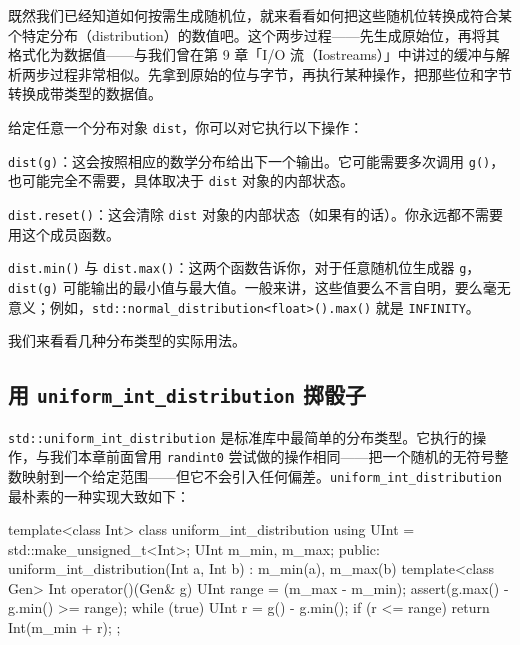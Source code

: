 既然我们已经知道如何按需生成随机位，就来看看如何把这些随机位转换成符合某个特定分布（distribution）的数值吧。这个两步过程——先生成原始位，再将其格式化为数据值——与我们曾在第 9 章「I/O 流（Iostreams）」中讲过的缓冲与解析两步过程非常相似。先拿到原始的位与字节，再执行某种操作，把那些位和字节转换成带类型的数据值。

给定任意一个分布对象 \texttt{dist}，你可以对它执行以下操作：

\texttt{dist(\allowbreak{}g)\allowbreak{}}：这会按照相应的数学分布给出下一个输出。它可能需要多次调用 \texttt{g(\allowbreak{})\allowbreak{}}，也可能完全不需要，具体取决于 \texttt{dist} 对象的内部状态。

\texttt{dist.\allowbreak{}reset(\allowbreak{})\allowbreak{}}：这会清除 \texttt{dist} 对象的内部状态（如果有的话）。你永远都不需要用这个成员函数。

\texttt{dist.\allowbreak{}min(\allowbreak{})\allowbreak{}} 与 \texttt{dist.\allowbreak{}max(\allowbreak{})\allowbreak{}}：这两个函数告诉你，对于任意随机位生成器 \texttt{g}，\texttt{dist(\allowbreak{}g)\allowbreak{}} 可能输出的最小值与最大值。一般来讲，这些值要么不言自明，要么毫无意义；例如，\texttt{std::\allowbreak{}normal\_\allowbreak{}distribution<\allowbreak{}float>\allowbreak{}(\allowbreak{})\allowbreak{}.max(\allowbreak{})\allowbreak{}} 就是 \texttt{INFINITY}。

我们来看看几种分布类型的实际用法。

\subsection{用 \texttt{uniform\_\allowbreak{}int\_\allowbreak{}distribution} 掷骰子}

\texttt{std::\allowbreak{}uniform\_\allowbreak{}int\_\allowbreak{}distribution} 是标准库中最简单的分布类型。它执行的操作，与我们本章前面曾用 \texttt{randint0} 尝试做的操作相同——把一个随机的无符号整数映射到一个给定范围——但它不会引入任何偏差。\texttt{uniform\_\allowbreak{}int\_\allowbreak{}distribution} 最朴素的一种实现大致如下：

\begin{codebox}[cpp]
    template<class Int>
    class uniform_int_distribution {
      using UInt = std::make_unsigned_t<Int>;
      UInt m_min, m_max;
    public:
      uniform_int_distribution(Int a, Int b) :
        m_min(a), m_max(b) {}
      template<class Gen>
      Int operator()(Gen& g) {
        UInt range = (m_max - m_min);
        assert(g.max() - g.min() >= range);
        while (true) {
          UInt r = g() - g.min();
          if (r <= range) {
            return Int(m_min + r);
          }
        }
      }
    };
\end{codebox}

